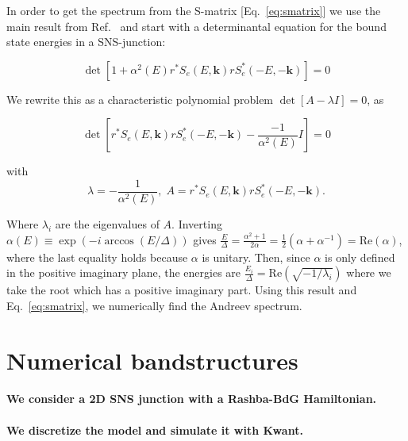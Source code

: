 \documentclass[english, twocolumn, 10pt, aps, superscriptaddress, floatfix, prb, citeautoscript]{revtex4-1}
\renewcommand{\comment}[2]{#2}
\renewcommand{\comment}{\paragraph}
\begin{document}
In order to get the spectrum from the S-matrix [Eq.~\eqref{eq:smatrix}] we use the main result from Ref.~ and start with a determinantal equation for the bound state energies in a SNS-junction:

\begin{equation}
\det\left[1+\alpha^{2}\left(E\right)r^{*}S_{e}\left(E,\bm{k}\right)rS_{e}^{*}\left(-E,-\bm{k}\right)\right]=0
\end{equation}

We rewrite this as a characteristic polynomial problem $\det\left[A-\lambda I\right]=0$, as

\begin{equation}
\det\left[r^{*}S_{e}\left(E,\bm{k}\right)rS_{e}^{*}\left(-E,-\bm{k}\right)-\frac{-1}{\alpha^{2}\left(E\right)}I\right]=0
\end{equation}

with
\begin{equation}
\lambda=-\frac{1}{\alpha^{2}\left(E\right)},\;A=r^{*}S_{e}\left(E,\bm{k}\right)rS_{e}^{*}\left(-E,-\bm{k}\right).
\end{equation}

Where $\lambda_i$ are the eigenvalues of $A$.
Inverting $\alpha\left(E\right)\equiv\exp\left(-i\arccos\left(E/\Delta\right)\right)$ gives $\frac{E}{\Delta}=\frac{\alpha^{2}+1}{2\alpha}=\frac{1}{2}\left(\alpha+\alpha^{-1}\right)=\textrm{Re}(\alpha)$, where the last equality holds because $\alpha$ is unitary.
Then, since $\alpha$ is only defined in the positive imaginary plane, the energies are $\frac{E_{i}}{\Delta}=\textrm{Re}\left(\sqrt{-1/\lambda_{i}}\right)$ where we take the root which has a positive imaginary part.
Using this result and Eq.~\eqref{eq:smatrix}, we numerically find the Andreev spectrum.

\section{Numerical bandstructures}

\comment{We consider a 2D SNS junction with a Rashba-BdG Hamiltonian.}

\comment{We discretize the model and simulate it with Kwant.}


\end{document}

